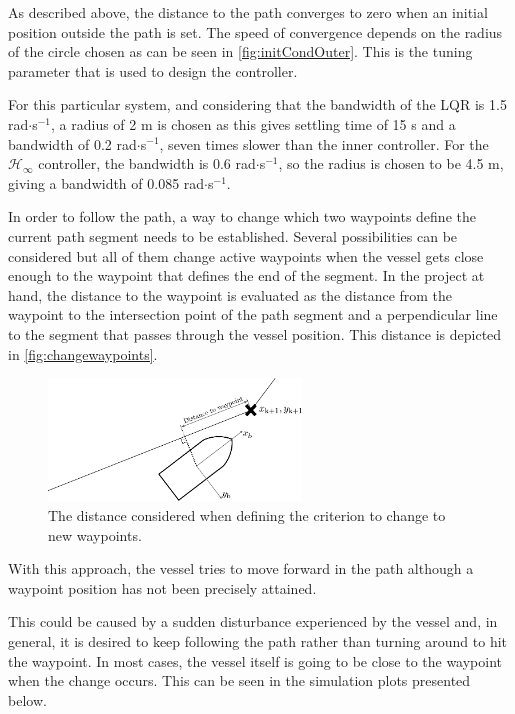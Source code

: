 As described above, the distance to the path converges to zero when an initial position outside the path is set. The speed of convergence depends on the radius of the circle chosen as can be seen in \autoref{fig:initCondOuter}. This is the tuning parameter that is used to design the controller.

For this particular system, and considering that the bandwidth of the LQR is \num{1.5} rad$\cdot$s$^{-1}$, a radius of \num{2} m is chosen as this gives settling time of 15 s and a bandwidth of \num{0.2} rad$\cdot$s$^{-1}$, seven times slower than the inner controller. For the $\mathcal{H}_\infty$ controller, the bandwidth is \num{0.6} rad$\cdot$s$^{-1}$, so the radius is chosen to be \num{4.5} m, giving a bandwidth of \num{0.085} rad$\cdot$s$^{-1}$.

In order to follow the path, a way to change which two waypoints define the current path segment needs to be established. Several possibilities can be considered but all of them change active waypoints when the vessel gets close enough to the waypoint that defines the end of the segment. In the project at hand, the distance to the waypoint is evaluated as the distance from the waypoint to the intersection point of the path segment and a perpendicular line to the segment that passes through the vessel position. This distance is depicted in \autoref{fig:changewaypoints}.
\begin{figure}[H]
	\includegraphics[width=0.6\textwidth]{figures/LOSalgorithmdistancewp}
	\caption{The distance considered when defining the criterion to change to new waypoints.}
	\label{fig:changewaypoints}
\end{figure}
With this approach, the vessel tries to move forward in the path although a waypoint position has not been precisely attained.

This could be caused by a sudden disturbance experienced by the vessel and, in general, it is desired to keep following the path rather than turning around to hit the waypoint. In most cases, the vessel itself is going to be close to the waypoint when the change occurs. This can be seen in the simulation plots presented below. 

	



